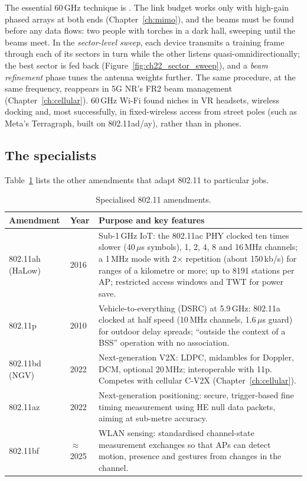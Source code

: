 
The essential 60\,GHz technique is . The link budget works only with
high-gain phased arrays at both ends (Chapter~\ref{ch:mimo}), and the beams must be found before any
data flows: two people with torches in a dark hall, sweeping until the beams meet. In the
\emph{sector-level sweep}, each device transmits a training frame through each of its sectors in turn
while the other listens quasi-omnidirectionally; the best sector is fed back
(Figure~\ref{fig:ch22_sector_sweep}), and a \emph{beam refinement} phase tunes the antenna weights
further. The same procedure, at the same frequency, reappears in 5G NR's FR2 beam management
(Chapter~\ref{ch:cellular}). 60\,GHz Wi-Fi found niches in VR headsets, wireless docking and, most
successfully, in fixed-wireless access from street poles (such as Meta's Terragraph, built on
802.11ad/ay), rather than in phones.

\subsection{The specialists}

Table~\ref{tab:ch22:special} lists the other amendments that adapt 802.11 to particular jobs.

\begin{table}[htbp]\centering\footnotesize
\caption{Specialised 802.11 amendments.}
\label{tab:ch22:special}
\begin{tabularx}{\linewidth}{@{}l l X@{}}
\toprule
Amendment & Year & Purpose and key features\\
\midrule
802.11ah (HaLow) & 2016 & Sub-1\,GHz IoT: the 802.11ac PHY clocked ten times slower (40\,$\mu$s symbols), 1, 2, 4, 8 and 16\,MHz channels; a 1\,MHz mode with 2$\times$ repetition (about 150\,kb/s) for ranges of a kilometre or more; up to 8191 stations per AP; restricted access windows and TWT for power save.\\
802.11p & 2010 & Vehicle-to-everything (DSRC) at 5.9\,GHz: 802.11a clocked at half speed (10\,MHz channels, 1.6\,$\mu$s guard) for outdoor delay spreads; ``outside the context of a BSS'' operation with no association.\\
802.11bd (NGV) & 2022 & Next-generation V2X: LDPC, midambles for Doppler, DCM, optional 20\,MHz; interoperable with 11p. Competes with cellular C-V2X (Chapter~\ref{ch:cellular}).\\
802.11az & 2022 & Next-generation positioning: secure, trigger-based fine timing measurement using HE null data packets, aiming at sub-metre accuracy.\\
802.11bf & $\approx$2025 & WLAN sensing: standardised channel-state measurement exchanges so that APs can detect motion, presence and gestures from changes in the channel.\\
\bottomrule
\end{tabularx}
\end{table}

